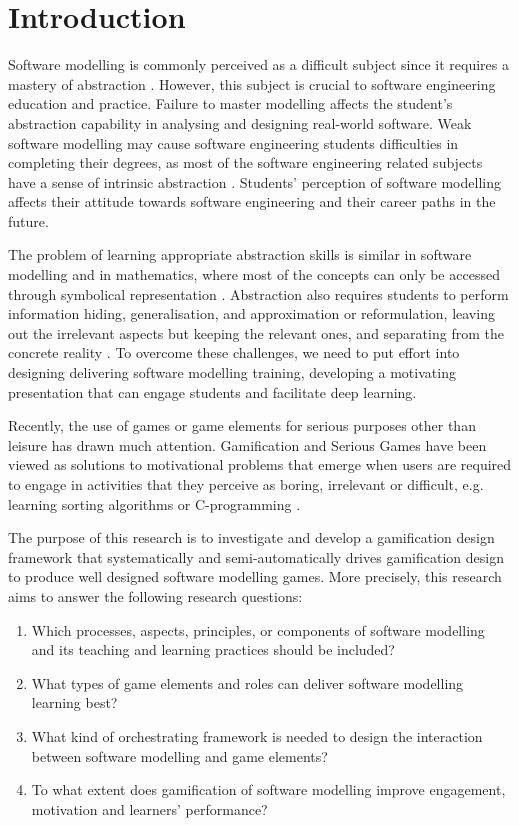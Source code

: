 \documentclass[runningheads,a4paper]{llncs}
\begin{document}
\section{Introduction}
Software modelling is commonly perceived as a difficult subject since it requires a mastery of abstraction \cite{Borstler2012}. However, this subject is crucial to software engineering education and practice. Failure to master modelling affects the student’s abstraction capability in analysing and designing real-world software. Weak software modelling may cause software engineering students difficulties in completing their degrees, as most of the software engineering related subjects have a sense of intrinsic abstraction  \cite{Kramer2007}. Students' perception of software modelling  affects their attitude towards software engineering  and their career paths in the future.

The problem of learning appropriate abstraction skills is similar in software modelling and in mathematics, where most of the concepts can only be accessed through symbolical representation \cite{Duval2006}. Abstraction also requires  students to perform information hiding, generalisation, and approximation or reformulation, leaving out the irrelevant aspects but keeping the relevant ones, and separating from the concrete reality \cite{Saitta2013}. To overcome these challenges, we need to put  effort into designing delivering software modelling training, developing a motivating presentation that can engage students and facilitate deep learning.

Recently, the use of games or game elements for serious purposes other than leisure has drawn much attention. Gamification \cite{deterding2011game} and Serious Games \cite{Michael2005} have been viewed as solutions to motivational problems that emerge when users are required to engage in activities that they perceive as boring, irrelevant or difficult, e.g. learning sorting algorithms \cite{Yohannis2015} or C-programming \cite{Ibanez2014}.

The purpose of this research is to investigate and develop a gamification design framework that systematically and semi-automatically drives gamification design to produce well designed software modelling games. More precisely, this research aims to answer the following research questions:
\begin{enumerate}
\item Which processes, aspects, principles, or components of software modelling and its teaching and learning practices should be included?
\item What types of game elements and  roles  can deliver software modelling learning best? 
\item What kind of  orchestrating framework is needed to design the interaction between software modelling and game elements?
\item To what extent does gamification of software modelling improve engagement, motivation and  learners’ performance?
\end{enumerate}
\end{document}
